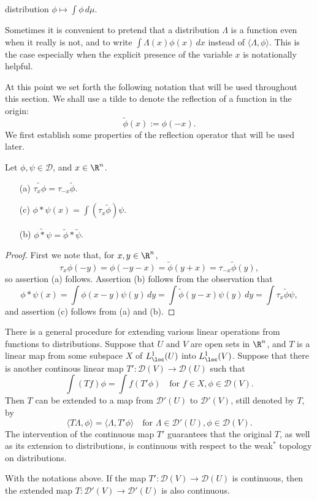 distribution $\phi\mapsto\int\phi\,d\mu$.\par
Sometimes it is convenient to pretend that a distribution $\Lambda$ is a function even when it really is not, and to write $\int\Lambda(x)\phi(x)\,dx$ instead of $\langle\Lambda,\phi\rangle$. This is the case especially when the explicit presence of the variable $x$ is notationally helpful.\par
At this point we set forth the following notation that will be used throughout this section. We shall use a tilde to denote the reflection of a function in the origin:
\[\tilde{\phi}(x):=\phi(-x).\]
We first establish some properties of the reflection operator that will be used later.
\begin{lemma}\label{reflection prop}
Let $\phi,\psi\in\mathscr{D}$, and $x\in\R^n$.
\begin{itemize}
\item[(a)] $\widetilde{\tau_{x}\phi}=\tau_{-x}\tilde{\phi}$.
\item[(c)] $\phi\ast\psi(x)=\int(\tau_x\tilde{\phi})\psi$.
\item[(b)] $\widetilde{\phi\ast\psi}=\tilde{\phi}\ast\tilde{\psi}$.  
\end{itemize}
\end{lemma}
\begin{proof}
First we note that, for $x,y\in\R^n$,
\[\tau_x\phi(-y)=\phi(-y-x)=\tilde{\phi}(y+x)=\tau_{-x}\tilde{\phi}(y),\]
so assertion (a) follows. Assertion (b) follows from the observation that
\[\phi\ast\psi(x)=\int\phi(x-y)\psi(y)\,dy=\int\tilde{\phi}(y-x)\psi(y)\,dy=\int\tau_x\tilde{\phi}\psi,\]
and assertion (c) follows from (a) and (b).
\end{proof}
There is a general procedure for extending various linear operations from functions to distributions. Suppose that $U$ and $V$ are open sets in $\R^n$, and $T$ is a linear map from some subspace $X$ of $L^1_{\loc}(U)$ into $L^1_{\loc}(V)$. Suppose that there is another continous linear map $T':\mathscr{D}(V)\to\mathscr{D}(U)$ such that
\[\int(Tf)\phi=\int f(T'\phi)\quad\text{for }f\in X,\phi\in\mathscr{D}(V).\]
Then $T$ can be extended to a map from $\mathscr{D}'(U)$ to $\mathscr{D}'(V)$, still denoted by $T$, by
\[\langle T\Lambda,\phi\rangle=\langle\Lambda,T'\phi\rangle\quad\text{for }\Lambda\in\mathscr{D}'(U),\phi\in\mathscr{D}(V).\]
The intervention of the continuous map $T'$ guarantees that the original $T$, as well as its extension to distributions, is continuous with respect to the weak$^*$ topology on distributions.
\begin{proposition}\label{distribution induced map continuous}
With the notations above. If the map $T':\mathscr{D}(V)\to\mathscr{D}(U)$ is continuous, then the extended map $T:\mathscr{D}'(V)\to\mathscr{D}'(U)$ is also continuous.
\end{proposition}
